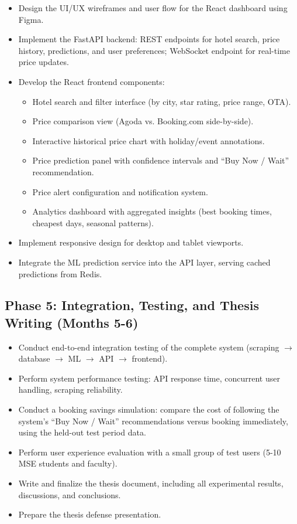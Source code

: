 \documentclass[12pt,a4paper]{report}
\begin{document}
\begin{itemize}
    \item Design the UI/UX wireframes and user flow for the React dashboard using Figma.
    \item Implement the FastAPI backend: REST endpoints for hotel search, price history, predictions, and user preferences; WebSocket endpoint for real-time price updates.
    \item Develop the React frontend components:
    \begin{itemize}
        \item Hotel search and filter interface (by city, star rating, price range, OTA).
        \item Price comparison view (Agoda vs. Booking.com side-by-side).
        \item Interactive historical price chart with holiday/event annotations.
        \item Price prediction panel with confidence intervals and ``Buy Now / Wait'' recommendation.
        \item Price alert configuration and notification system.
        \item Analytics dashboard with aggregated insights (best booking times, cheapest days, seasonal patterns).
    \end{itemize}
    \item Implement responsive design for desktop and tablet viewports.
    \item Integrate the ML prediction service into the API layer, serving cached predictions from Redis.
\end{itemize}

\subsection{Phase 5: Integration, Testing, and Thesis Writing (Months 5-6)}

\begin{itemize}
    \item Conduct end-to-end integration testing of the complete system (scraping $\rightarrow$ database $\rightarrow$ ML $\rightarrow$ API $\rightarrow$ frontend).
    \item Perform system performance testing: API response time, concurrent user handling, scraping reliability.
    \item Conduct a booking savings simulation: compare the cost of following the system's ``Buy Now / Wait'' recommendations versus booking immediately, using the held-out test period data.
    \item Perform user experience evaluation with a small group of test users (5-10 MSE students and faculty).
    \item Write and finalize the thesis document, including all experimental results, discussions, and conclusions.
    \item Prepare the thesis defense presentation.
\end{itemize}
\end{document}
